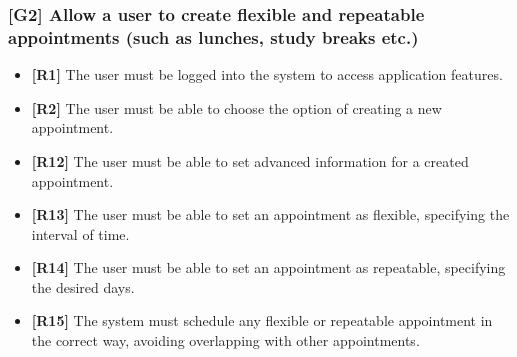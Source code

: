 \subsubsection{[G2] Allow a user to create flexible and repeatable appointments (such as lunches, study breaks etc.)}
\begin{itemize}
	\item \textbf{[R1]} The user must be logged into the system to access application features.
	\item \textbf{[R2]} The user must be able to choose the option of creating a new appointment.
	\item \textbf{[R12]} The user must be able to set advanced information for a created appointment.
	\item \textbf{[R13]} The user must be able to set an appointment as flexible, specifying the interval of time.
	\item \textbf{[R14]} The user must be able to set an appointment as repeatable, specifying the desired days.
	\item \textbf{[R15]} The system must schedule any flexible or repeatable appointment in the correct way, avoiding overlapping with other appointments.	
\end{itemize}

